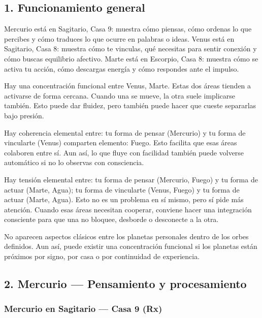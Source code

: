 \documentclass[11pt,a4paper]{article}
\begin{document}
\subsection{1. Funcionamiento general}

\justifying
Mercurio está en Sagitario, Casa 9: muestra cómo piensas, cómo ordenas lo que percibes y cómo traduces lo que ocurre en palabras o ideas.
Venus está en Sagitario, Casa 8: muestra cómo te vinculas, qué necesitas para sentir conexión y cómo buscas equilibrio afectivo.
Marte está en Escorpio, Casa 8: muestra cómo se activa tu acción, cómo descargas energía y cómo respondes ante el impulso.

Hay una concentración funcional entre Venus, Marte. Estas dos áreas tienden a activarse de forma cercana. Cuando una se mueve, la otra suele implicarse también. Esto puede dar fluidez, pero también puede hacer que cueste separarlas bajo presión.

Hay coherencia elemental entre: tu forma de pensar (Mercurio) y tu forma de vincularte (Venus) comparten elemento: Fuego. Esto facilita que esas áreas colaboren entre sí. Aun así, lo que fluye con facilidad también puede volverse automático si no lo observas con consciencia.

Hay tensión elemental entre: tu forma de pensar (Mercurio, Fuego) y tu forma de actuar (Marte, Agua); tu forma de vincularte (Venus, Fuego) y tu forma de actuar (Marte, Agua). Esto no es un problema en sí mismo, pero sí pide más atención. Cuando esas áreas necesitan cooperar, conviene hacer una integración consciente para que una no bloquee, desborde o desconecte a la otra.

No aparecen aspectos clásicos entre los planetas personales dentro de los orbes definidos. Aun así, puede existir una concentración funcional si los planetas están próximos por signo, por casa o por continuidad de experiencia.

\vspace{0.8cm}

\subsection{2. Mercurio — Pensamiento y procesamiento}

\subsubsection*{Mercurio en Sagitario — Casa 9 (Rx)}
\end{document}
